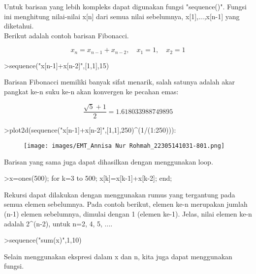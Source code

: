 \documentclass[a4paper,10pt]{article}
\begin{document}
\begin{eulernotebook}
\begin{eulercomment}
Untuk barisan yang lebih kompleks dapat digunakan fungsi "sequence()".
Fungsi ini menghitung nilai-nilai x[n] dari semua nilai sebelumnya,
x[1],...,x[n-1] yang diketahui.\\
Berikut adalah contoh barisan Fibonacci.

\end{eulercomment}
\begin{eulerformula}
\[
x_n = x_{n-1}+x_{n-2}, \quad x_1=1, \quad x_2 =1
\]
\end{eulerformula}
\begin{eulerprompt}
>sequence("x[n-1]+x[n-2]",[1,1],15)
\end{eulerprompt}
\begin{euleroutput}
  [1,  1,  2,  3,  5,  8,  13,  21,  34,  55,  89,  144,  233,  377,  610]
\end{euleroutput}
\begin{eulercomment}
Barisan Fibonacci memiliki banyak sifat menarik, salah satunya adalah
akar pangkat ke-n suku ke-n akan konvergen ke pecahan emas:
\end{eulercomment}
\begin{eulerformula}
\[
\frac{\sqrt{5}+1}{2}=1.618033988749895
\]
\end{eulerformula}
\begin{eulerprompt}
>plot2d(sequence("x[n-1]+x[n-2]",[1,1],250)^(1/(1:250))):
\end{eulerprompt}
\begin{figure}[h]
    \centering
    \texttt{[image: images/EMT\_Annisa Nur Rohmah\_22305141031-801.png]}
\end{figure}
\begin{eulercomment}
Barisan yang sama juga dapat dihasilkan dengan menggunakan loop.
\end{eulercomment}
\begin{eulerprompt}
>x=ones(500); for k=3 to 500; x[k]=x[k-1]+x[k-2]; end;
\end{eulerprompt}
\begin{eulercomment}
Rekursi dapat dilakukan dengan menggunakan rumus yang tergantung pada
semua elemen sebelumnya. Pada contoh berikut, elemen ke-n merupakan
jumlah (n-1) elemen sebelumnya, dimulai dengan 1 (elemen ke-1). Jelas,
nilai elemen ke-n adalah 2\textasciicircum{}(n-2), untuk n=2, 4, 5, ....
\end{eulercomment}
\begin{eulerprompt}
>sequence("sum(x)",1,10)
\end{eulerprompt}
\begin{euleroutput}
  [1,  1,  2,  4,  8,  16,  32,  64,  128,  256]
\end{euleroutput}
\begin{eulercomment}
Selain menggunakan ekspresi dalam x dan n, kita juga dapat menggunakan
fungsi.


\end{eulercomment}
\end{eulernotebook}
\end{document}
